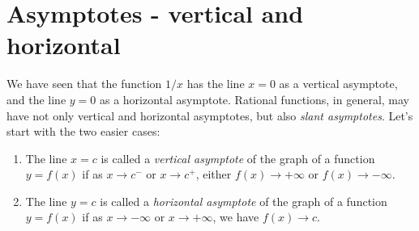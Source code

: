 \documentclass{ximera}
\begin{document}
\section{Asymptotes - vertical and horizontal}

We have seen that the function $1/x$ has the line $x=0$ as a vertical asymptote, and the line $y=0$ as a horizontal asymptote. Rational functions, in general, may have not only vertical and horizontal asymptotes, but also \emph{slant asymptotes}. Let's start with the two easier cases:

\begin{definition}
  \mbox{}
  \begin{enumerate}
  \item The line $x=c$ is called a \emph{vertical asymptote} of the graph of a function $y=f(x)$ if as $x \to c^-$ or $x \to c^+$, either $f(x) \to +\infty$ or $f(x) \to -\infty$.
  \item The line $y=c$ is called a \emph{horizontal asymptote} of the graph of a function $y=f(x)$ if as $x \to -\infty$ or $x \to +\infty$, we have $f(x) \to c$.
  \end{enumerate}
\end{definition}
\end{document}
